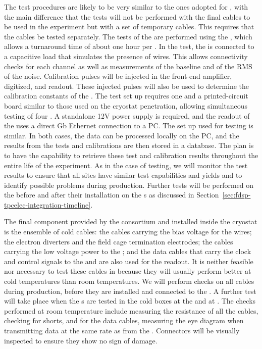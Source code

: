 The test procedures are likely to be
very similar to the ones adopted for , with the main
difference that the tests will not be performed with
the final cables to be used in the experiment but 
with a set of temporary cables. This requires that the 
cables be tested separately. The tests of the 
are performed using the , which allows a turnaround
time of about one hour per . In the
test, the  is connected to a capacitive load that
simulates the presence of  wires. This allows
connectivity checks for each channel as well as measurements of
the baseline and of the RMS of the noise. Calibration 
pulses will be injected in the front-end amplifier, digitized,
and readout. These injected pulses will also be used
to determine the calibration constants of the . 
The test set up requires one  and
a printed-circuit board similar to those used on the cryostat
penetration, allowing simultaneous testing of four .
A standalone 12V power supply is required, and the readout
of the  uses a direct Gb Ethernet connection to
a PC. The set up used for  testing is similar.
In both cases, the data can be processed locally on the PC,
and the results from the tests and calibrations are then stored 
in a database. The plan is to have the capability to retrieve  
these test and calibration results throughout the entire life
of the experiment. As in the case of  testing,
we will monitor the test results to ensure that all
sites have similar test capabilities and yields and to
identify possible problems during production.
Further tests will be performed on the 
before and after their installation on the s as
discussed in Section~\ref{sec:fdsp-tpcelec-integration-timeline}.

The final component provided by the  consortium
and installed inside the cryostat is the ensemble of cold
cables: the cables carrying the bias voltage for the 
wires; the electron diverters and the field cage termination electrodes;
the cables carrying the low voltage power to the ;
and the data cables that carry the clock and control signals
to the  and are also used for the readout. It is neither
feasible nor necessary to test these cables in \lntwo
because they will usually perform better at cold temperatures than 
room temperatures. We will perform checks on all cables 
during production, before they are installed and 
connected to the . A further test will take place
when the s are tested in the cold boxes at the 
and at . The checks performed at room temperature include
measuring the resistance of all the cables, checking for
shorts, and for the data cables, measuring the
eye diagram when transmitting data at the same rate as from the
. Connectors will be visually inspected 
to ensure they show no sign of damage.

